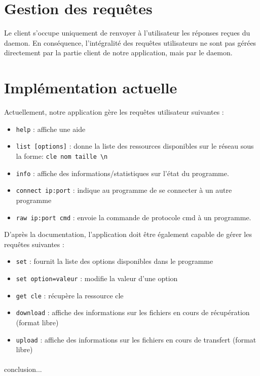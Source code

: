 	\section{Gestion des requ\^etes}

Le client s'occupe uniquement de renvoyer à l'utilisateur les réponses reçues
du daemon. En conséquence, l'intégralité des requêtes utilisateurs ne sont pas 
gérées directement par la partie client de notre application, mais par le 
daemon.
	
	\section{Implémentation actuelle}

Actuellement, notre application gère les requêtes utilisateur suivantes :
\begin{itemize}
\item \verb"help" : affiche une aide
\item \verb"list [options]" : donne la liste des ressources disponibles sur le 
      réseau sous la forme: \verb"cle nom taille \n"
\item \verb"info" : affiche des informations/statistiques sur l'état du 
      programme.
\item \verb"connect ip:port" : indique au programme de se connecter à un autre 
      programme
\item \verb"raw ip:port cmd" : envoie la commande de protocole cmd à un 
      programme. 
\end{itemize}

D'après la documentation, l'application doit être également capable de gérer 
les requêtes suivantes :
\begin{itemize}
\item \verb"set" : fournit la liste des options disponibles dans le programme
\item \verb"set option=valeur" : modifie la valeur d'une option
\item \verb"get cle" : récupère la ressource cle
\item \verb"download" : affiche des informations sur les fichiers en cours de 
      récupération (format libre)
\item \verb"upload" : affiche des informations sur les fichiers en cours de 
      transfert (format libre)
\end{itemize}
	
	\paragraph{}conclusion...
